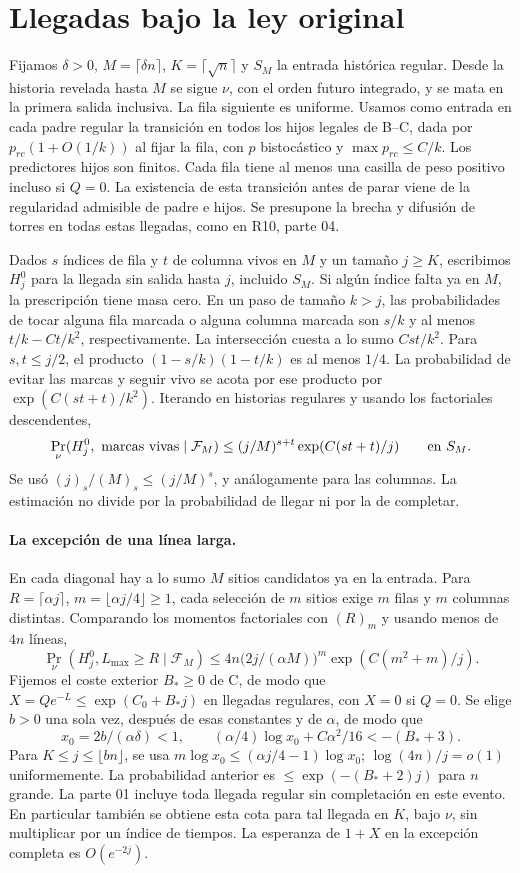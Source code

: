 \section{Llegadas bajo la ley original}
Fijamos $\delta>0$, $M=\lceil\delta n\rceil$, $K=\lceil\sqrt n\rceil$ y
$S_M$ la entrada histórica regular. Desde la historia revelada hasta $M$ se sigue
$\nu$, con el orden futuro integrado, y se mata en la primera salida inclusiva.
La fila siguiente es uniforme. Usamos como entrada en cada padre regular la transición
en todos los hijos legales de B--C, dada por $p_{rc}(1+O(1/k))$ al fijar la fila,
con $p$ bistocástico y $\max p_{rc}\le C/k$. Los predictores hijos son finitos.
Cada fila tiene al menos una casilla de peso positivo incluso si $Q=0$. La existencia
de esta transición antes de parar viene de la regularidad admisible de padre e hijos.
Se presupone la brecha y difusión de torres en todas estas llegadas, como en R10, parte 04.

Dados $s$ índices de fila y $t$ de columna vivos en $M$ y un tamaño $j\ge K$,
escribimos $H_j^0$ para la llegada sin salida hasta $j$, incluido $S_M$.
Si algún índice falta ya en $M$, la prescripción tiene masa cero.
En un paso de tamaño $k>j$, las probabilidades de tocar alguna fila marcada o
alguna columna marcada son $s/k$ y al menos $t/k-Ct/k^2$, respectivamente.
La intersección cuesta a lo sumo $Cst/k^2$. Para $s,t\le j/2$,
el producto $(1-s/k)(1-t/k)$ es al menos $1/4$. La probabilidad de evitar
las marcas y seguir vivo se acota por ese producto por $\exp(C(st+t)/k^2)$.
Iterando en historias regulares y usando los factoriales descendentes,
\[
 \Pr_\nu(H^0_j,\ {\rm marcas\ vivas}\mid\mathcal F_M)
 \le (j/M)^{s+t}\exp(C(st+t)/j) \qquad\text{en }S_M .
\]
Se usó $(j)_s/(M)_s\le(j/M)^s$, y análogamente para las columnas.
La estimación no divide por la probabilidad de llegar ni por la de completar.

\paragraph{La excepción de una línea larga.}
En cada diagonal hay a lo sumo $M$ sitios candidatos ya en la entrada.
Para $R=\lceil\alpha j\rceil$, $m=\lfloor\alpha j/4\rfloor\ge1$,
cada selección de $m$ sitios exige $m$ filas y $m$ columnas distintas.
Comparando los momentos factoriales con $(R)_m$ y usando menos de $4n$ líneas,
\[
 \Pr_\nu(H_j^0,L_{\max}\ge R\mid\mathcal F_M)
 \le 4n\bigl(2j/(\alpha M)\bigr)^m\exp(C(m^2+m)/j).
\]
Fijemos el coste exterior $B_*\ge0$ de C, de modo que
$X=Qe^{-L}\le \exp(C_0+B_*j)$ en llegadas regulares, con $X=0$ si $Q=0$.
Se elige $b>0$ una sola vez, después de esas constantes y de $\alpha$, de modo que
\[
 x_0=2b/(\alpha\delta)<1,\qquad
 (\alpha/4)\log x_0+C\alpha^2/16<-(B_*+3).
\]
Para $K\le j\le\lfloor bn\rfloor$, se usa $m\log x_0\le(\alpha j/4-1)\log x_0$;
$\log(4n)/j=o(1)$ uniformemente. La probabilidad anterior es
$\le\exp(-(B_*+2)j)$ para $n$ grande. La parte 01 incluye toda llegada regular
sin completación en este evento. En particular también se obtiene esta cota
para tal llegada en $K$, bajo $\nu$, sin multiplicar por un índice de tiempos.
La esperanza de $1+X$ en la excepción completa es $O(e^{-2j})$.


